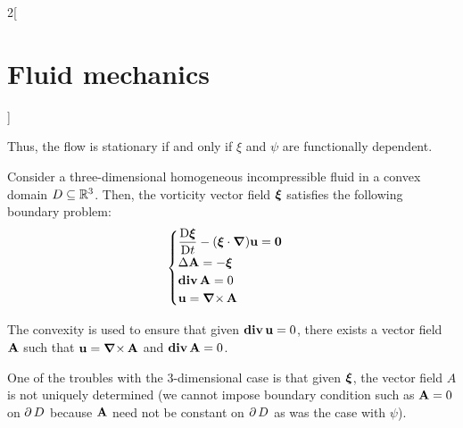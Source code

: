 \documentclass[../../../main_physics.tex]{subfiles}
\begin{document}
\begin{multicols}{2}[\section{Fluid mechanics}]
\begin{remark}
    Thus, the flow is stationary if and only if $\xi$ and $\psi$ are functionally dependent.
  \end{remark}
  \begin{theorem}
    Consider a three-dimensional homogeneous incompressible fluid in a convex domain $D\subseteq \mathbb{R}^3$. Then, the vorticity vector field $\boldsymbol{\mathrm{\xi}}$ satisfies the following boundary problem:
    $$
      \begin{cases}
        \displaystyle \frac{\mathrm{D}\boldsymbol{\mathrm{\xi}}}{\mathrm{D}t} - (\boldsymbol{\mathrm{\xi}}\cdot\grad)\boldsymbol{\mathrm{u}}=\boldsymbol{\mathrm{0}} \\
        \displaystyle \Delta\boldsymbol{\mathrm{A}} = -\boldsymbol{\mathrm{\xi}}                            \\
        \displaystyle \operatorname{\boldsymbol{\mathrm{div}}}\boldsymbol{\mathrm{A}}=0                                            \\
        \displaystyle \boldsymbol{\mathrm{u}}=\operatorname{\boldsymbol{\mathrm{\nabla}}\times}\boldsymbol{\mathrm{A}}
      \end{cases}
    $$
  \end{theorem}
  \begin{remark}
    The convexity is used to ensure that given $\operatorname{\boldsymbol{\mathrm{div}}} \boldsymbol{\mathrm{u}}=0$, there exists a vector field $\boldsymbol{\mathrm{A}}$ such that $\boldsymbol{\mathrm{u}}=\operatorname{\boldsymbol{\mathrm{\nabla}}\times}\boldsymbol{\mathrm{A}}$ and $\operatorname{\boldsymbol{\mathrm{div}}}\boldsymbol{\mathrm{A}}=0$.
  \end{remark}
  \begin{remark}
    One of the troubles with the 3-dimensional case is that given $\boldsymbol{\mathrm{\xi}}$, the vector field $A$ is not uniquely determined (we cannot impose boundary condition such as $\boldsymbol{\mathrm{A}} = 0$ on $\operatorname{\partial}{D}$ because $\boldsymbol{\mathrm{A}}$ need not be constant on $\operatorname{\partial}{D}$ as was the case with $\psi$).
  \end{remark}

\end{multicols}
\end{document}
